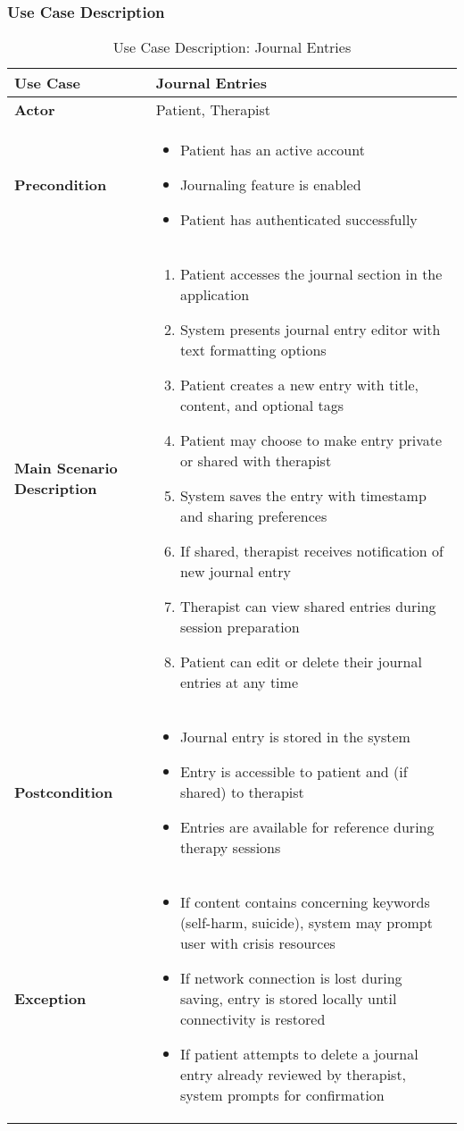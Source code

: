 \subsubsection{Use Case Description}
\begin{table}[h]
\centering
\begin{tabular}{|p{3cm}|p{10cm}|}
\hline
\textbf{Use Case} & Journal Entries \\
\hline
\textbf{Actor} & Patient, Therapist \\
\hline
\textbf{Precondition} & 
\begin{itemize}
    \item Patient has an active account
    \item Journaling feature is enabled
    \item Patient has authenticated successfully
\end{itemize} \\
\hline
\textbf{Main Scenario Description} & 
\begin{enumerate}
    \item Patient accesses the journal section in the application
    \item System presents journal entry editor with text formatting options
    \item Patient creates a new entry with title, content, and optional tags
    \item Patient may choose to make entry private or shared with therapist
    \item System saves the entry with timestamp and sharing preferences
    \item If shared, therapist receives notification of new journal entry
    \item Therapist can view shared entries during session preparation
    \item Patient can edit or delete their journal entries at any time
\end{enumerate} \\
\hline
\textbf{Postcondition} & 
\begin{itemize}
    \item Journal entry is stored in the system
    \item Entry is accessible to patient and (if shared) to therapist
    \item Entries are available for reference during therapy sessions
\end{itemize} \\
\hline
\textbf{Exception} & 
\begin{itemize}
    \item If content contains concerning keywords (self-harm, suicide), system may prompt user with crisis resources
    \item If network connection is lost during saving, entry is stored locally until connectivity is restored
    \item If patient attempts to delete a journal entry already reviewed by therapist, system prompts for confirmation
\end{itemize} \\
\hline
\end{tabular}
\caption{Use Case Description: Journal Entries}
\end{table}


